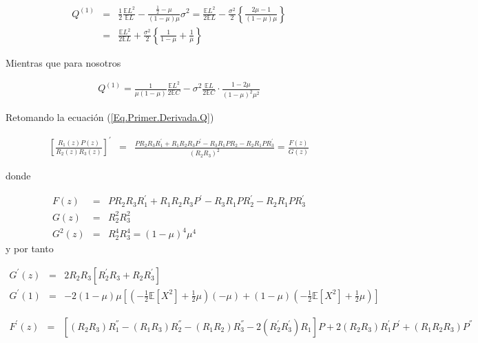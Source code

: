 \documentclass{article}
\newcommand{\esp}{\mathbb{E}}
\begin{document}
\begin{eqnarray*}
Q^{(1)}&=&\frac{1}{2}\frac{\esp L^{2}}{\esp L}-\frac{\frac{1}{2}-\mu}{\left(1-\mu\right)\mu}\sigma^{2}
=\frac{\esp L^{2}}{2\esp L}-\frac{\sigma^{2}}{2}\left\{\frac{2\mu-1}{\left(1-\mu\right)\mu}\right\}\\
&=&\frac{\esp L^{2}}{2\esp L}+\frac{\sigma^{2}}{2}\left\{\frac{1}{1-\mu}+\frac{1}{\mu}\right\}
\end{eqnarray*}

Mientras que para nosotros

\begin{eqnarray*}
Q^{(1)}=\frac{1}{\mu\left(1-\mu\right)}\frac{\esp L^{2}}{2\esp C}
-\sigma^{2}\frac{\esp L}{2\esp C}\cdot\frac{1-2\mu}{\left(1-\mu\right)^{2}\mu^{2}}
\end{eqnarray*}

Retomando la ecuaci\'on (\ref{Eq.Primer.Derivada.Q})

\begin{eqnarray*}
\left[\frac{R_{1}\left(z\right)P\left(z\right)}{R_{2}\left(z\right)R_{3}\left(z\right)}\right]^{'}&=&\frac{PR_{2}R_{3}R_{1}^{'}
+R_{1}R_{2}R_{3}P^{'}-R_{3}R_{1}PR_{2}-R_{2}R_{1}PR_{3}^{'}}{\left(R_{2}R_{3}\right)^{2}}
=\frac{F\left(z\right)}{G\left(z\right)}
\end{eqnarray*}

donde 

\begin{eqnarray*}
F\left(z\right)&=&PR_{2}R_{3}R_{1}^{'}
+R_{1}R_{2}R_{3}P^{'}-R_{3}R_{1}PR_{2}^{'}-R_{2}R_{1}PR_{3}^{'}\\
G\left(z\right)&=&R_{2}^{2}R_{3}^{2}\\
G^{2}\left(z\right)&=&R_{2}^{4}R_{3}^{4}=\left(1-\mu\right)^{4}\mu^{4}
\end{eqnarray*}
y por tanto

\begin{eqnarray*}
G^{'}\left(z\right)&=&2R_{2}R_{3}\left[R_{2}^{'}R_{3}+R_{2}R_{3}^{'}\right]\\
G^{'}\left(1\right)&=&-2\left(1-\mu\right)\mu\left[\left(-\frac{1}{2}\esp\left[X^{2}\right]+\frac{1}{2}\mu\right)\left(-\mu\right)+\left(1-\mu\right)\left(-\frac{1}{2}\esp\left[X^{2}\right]+\frac{1}{2}\mu\right)\right]
\end{eqnarray*}


\begin{eqnarray*}
F^{'}\left(z\right)&=&\left[\left(R_{2}R_{3}\right)R_{1}^{''}
-\left(R_{1}R_{3}\right)R_{2}^{''}
-\left(R_{1}R_{2}\right)R_{3}^{''}
-2\left(R_{2}^{'}R_{3}^{'}\right)R_{1}\right]P
+2\left(R_{2}R_{3}\right)R_{1}^{'}P^{'}
+\left(R_{1}R_{2}R_{3}\right)P^{''}
\end{eqnarray*}
\end{document}

